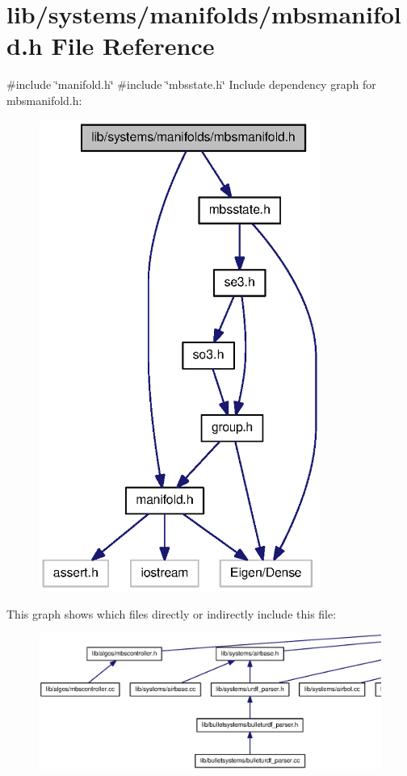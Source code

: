 \section{lib/systems/manifolds/mbsmanifold.h \-File \-Reference}
\label{mbsmanifold_8h}
{\ttfamily \#include \char`\"{}manifold.\-h\char`\"{}}\*
{\ttfamily \#include \char`\"{}mbsstate.\-h\char`\"{}}\*
\-Include dependency graph for mbsmanifold.\-h\-:
\nopagebreak
\begin{figure}[H]
\begin{center}
\leavevmode
\includegraphics[width=262pt]{mbsmanifold_8h__incl}
\end{center}
\end{figure}
\-This graph shows which files directly or indirectly include this file\-:
\nopagebreak
\begin{figure}[H]
\begin{center}
\leavevmode
\includegraphics[width=350pt]{mbsmanifold_8h__dep__incl}
\end{center}
\end{figure}
